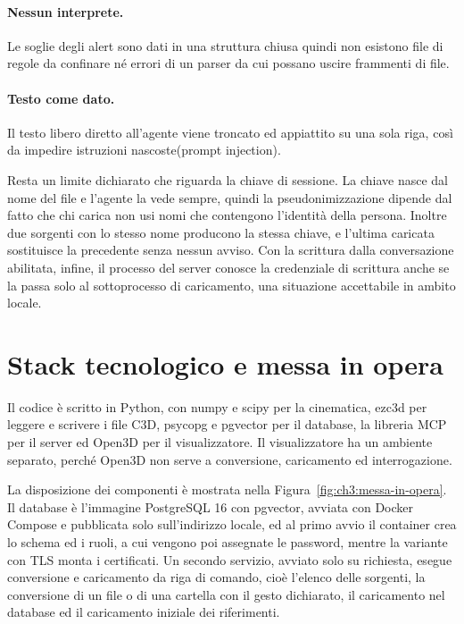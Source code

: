 \paragraph{Nessun interprete.} Le soglie degli alert sono dati in una struttura
chiusa quindi non esistono file di regole da confinare né errori di un parser da
cui possano uscire frammenti di file.

\paragraph{Testo come dato.} Il testo libero diretto all'agente viene troncato ed
appiattito su una sola riga, così da impedire istruzioni nascoste(prompt injection).

Resta un limite dichiarato che riguarda la chiave di sessione. La chiave nasce
dal nome del file e l'agente la vede sempre, quindi la pseudonimizzazione dipende
dal fatto che chi carica non usi nomi che contengono l'identità della persona.
Inoltre due sorgenti con lo stesso nome producono la stessa chiave, e l'ultima
caricata sostituisce la precedente senza nessun avviso. Con la scrittura dalla
conversazione abilitata, infine, il processo del server conosce la credenziale di
scrittura anche se la passa solo al sottoprocesso di caricamento, una situazione
accettabile in ambito locale.

\section{Stack tecnologico e messa in opera}
\label{sec:ch3:stack}

Il codice è scritto in Python, con numpy e scipy per la cinematica, ezc3d per
leggere e scrivere i file C3D, psycopg e pgvector per il database, la libreria MCP
per il server ed Open3D per il visualizzatore. Il visualizzatore ha un ambiente
separato, perché Open3D non serve a conversione, caricamento ed interrogazione.

La disposizione dei componenti è mostrata nella
Figura~\ref{fig:ch3:messa-in-opera}. Il database è l'immagine PostgreSQL 16 con
pgvector, avviata con Docker Compose e pubblicata solo sull'indirizzo locale, ed
al primo avvio il container crea lo schema ed i ruoli, a cui vengono poi
assegnate le password, mentre la variante con TLS monta i certificati. Un secondo
servizio, avviato solo su richiesta, esegue conversione e caricamento da riga di
comando, cioè l'elenco delle sorgenti, la conversione di un file o di una cartella
con il gesto dichiarato, il caricamento nel database ed il caricamento iniziale
dei riferimenti.

